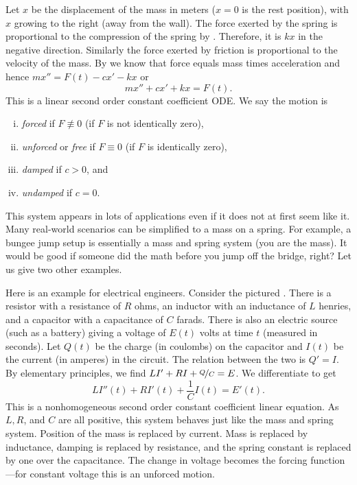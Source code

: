 Let $x$ be the displacement of the mass in meters ($x=0$ is the rest position), with
$x$ growing to the right (away from the wall).
The force exerted by the spring is proportional to the
compression of the spring by .
Therefore, it is $kx$ in the negative direction.
Similarly the force exerted by friction is proportional
to the velocity of the mass.
By  we know that force equals mass times acceleration
and hence $mx'' = F(t)-cx'-kx$ or
\begin{equation*}
mx'' + cx' + kx = F(t) .
\end{equation*}
This is a linear second order constant coefficient ODE\@.
We say the motion is
\begin{enumerate}[(i)]
\item \emph{forced} if $F \not\equiv 0$ (if $F$ is not identically zero),
\item \emph{unforced} or \emph{free} if $F \equiv 0$ (if $F$ is identically zero),
\item \emph{damped} if $c > 0$, and
\item \emph{undamped} if $c = 0$.
\end{enumerate}

This system appears in lots of applications even if it does not at first
seem like it.  Many real-world scenarios can be simplified to
a mass on a spring.  For example, a bungee jump setup is essentially a mass
and spring system (you are the mass).  It would be good if someone did the math
before you jump off the bridge, right?  Let us give two other examples.

\medskip

\begin{mywrapfigsimp}[5]{1.35in}{1.65in}
\noindent
{}
\end{mywrapfigsimp}
Here is an example for electrical engineers.  Consider the
pictured .
There is a resistor with a resistance of $R$ ohms, an
inductor with an inductance of $L$ henries,
and a capacitor with a capacitance of $C$ farads.  There is also
an electric source (such as a battery) giving a voltage of $E(t)$ volts
at time $t$ (measured in seconds).
Let $Q(t)$ be the charge (in coulombs) on the capacitor
and $I(t)$ be the current (in amperes) in the circuit.  The relation between the two is
$Q' = I$.  By elementary principles, we find 
$L I' + RI + \nicefrac{Q}{C} = E$.   We differentiate to get
\begin{equation*}
L I''(t) + R I'(t) + \frac{1}{C} I(t) = E'(t) .
\end{equation*}
This is a nonhomogeneous second order constant coefficient linear equation.
As $L, R$, and $C$ are all positive, this system behaves just like the
mass and spring system.  Position of the mass is replaced by current.
Mass is replaced by inductance, damping is replaced by resistance, and
the spring constant is replaced by one over the capacitance.  The change in
voltage becomes the forcing function---for constant voltage this is an
unforced motion.

